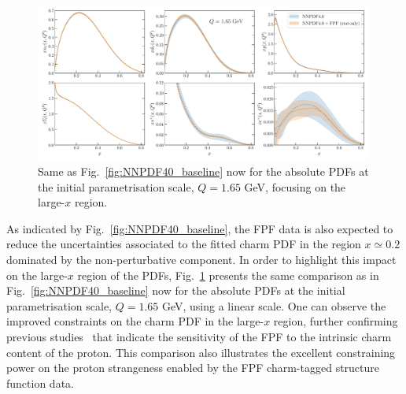 \begin{figure}[t]
\centering
\includegraphics[width=0.99\textwidth]{plots/NNPDF40-FPFall-q1p65gev-abs.pdf}
\caption{
  Same as Fig.~\ref{fig:NNPDF40_baseline} now for the absolute PDFs
  at the initial parametrisation scale, $Q=1.65$ GeV, focusing
  on the large-$x$ region.
%
}
\label{fig:NNPDF40_lowQ_abs}
\end{figure}

As indicated by Fig.~\ref{fig:NNPDF40_baseline}, the FPF data is also expected
to reduce the uncertainties associated to the fitted charm PDF in the region $x\simeq 0.2$
dominated by the non-perturbative component.
%
In order to highlight this impact on the large-$x$ region of the PDFs,
Fig.~\ref{fig:NNPDF40_lowQ_abs} presents the same comparison as
in  Fig.~\ref{fig:NNPDF40_baseline} now for the absolute PDFs
at the initial parametrisation scale, $Q=1.65$ GeV, using a linear scale.
%
One can observe the improved constraints on the charm PDF in the large-$x$ region,
further confirming previous studies~\cite{Anchordoqui:2021ghd,Feng:2022inv} that indicate the
sensitivity of the FPF to the intrinsic charm content of the proton.
%
This comparison also illustrates the excellent constraining power on the proton
strangeness enabled by the FPF charm-tagged structure function data.

